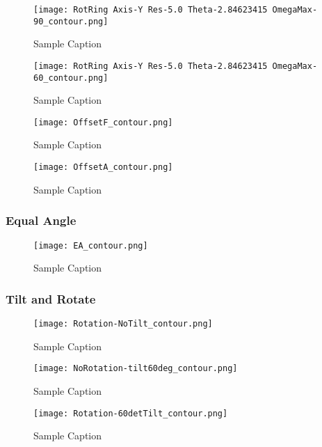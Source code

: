 \documentclass{article}
\begin{document}
\begin{figure}[ht]
    \centering
    \texttt{[image: RotRing Axis-Y Res-5.0 Theta-2.84623415 OmegaMax-90\_contour.png]}
    \caption{Sample Caption}
\end{figure}

\begin{figure}[ht]
    \centering
    \texttt{[image: RotRing Axis-Y Res-5.0 Theta-2.84623415 OmegaMax-60\_contour.png]}
    \caption{Sample Caption}
\end{figure}


\begin{figure}[ht]
    \centering
    \texttt{[image: OffsetF\_contour.png]}
    \caption{Sample Caption}
\end{figure}

\begin{figure}[ht]
    \centering
    \texttt{[image: OffsetA\_contour.png]}
    \caption{Sample Caption}
\end{figure}


\subsubsection{Equal Angle}

\begin{figure}[ht]
    \centering
    \texttt{[image: EA\_contour.png]}
    \caption{Sample Caption}
\end{figure}

\subsubsection{Tilt and Rotate}

\begin{figure}[ht]
    \centering
    \texttt{[image: Rotation-NoTilt\_contour.png]}
    \caption{Sample Caption}
\end{figure}


\begin{figure}[ht]
    \centering
    \texttt{[image: NoRotation-tilt60deg\_contour.png]}
    \caption{Sample Caption}
\end{figure}


\begin{figure}[ht]
    \centering
    \texttt{[image: Rotation-60detTilt\_contour.png]}
    \caption{Sample Caption}
\end{figure}
\end{document}

